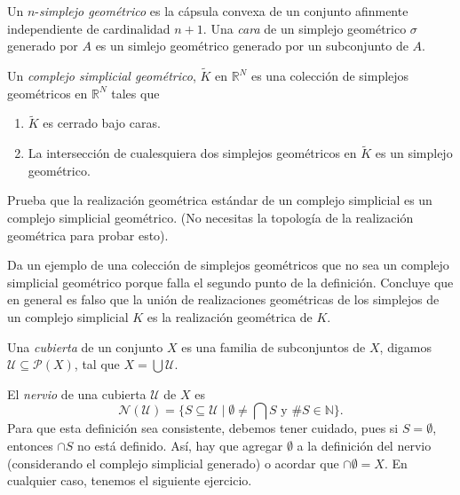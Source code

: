 \documentclass{standalone}
\begin{document}
	\begin{definition}\label{def:geometric_simplex}
		Un $n$-\emph{simplejo geométrico} es la cápsula convexa de un conjunto afinmente independiente de cardinalidad $n+1$. Una \emph{cara} de un simplejo geométrico $\sigma$ generado por $A$ es un simlejo geométrico generado por un subconjunto de $A$.
	\end{definition}
	
	\begin{definition}
		Un \emph{complejo simplicial geométrico}, $\tilde{K}$ en $\mathbb{R}^{N}$ es una colección de simplejos geométricos en $\mathbb{R}^{N}$ tales que
		\begin{enumerate}
			\item $\tilde{K}$ es cerrado bajo caras.
			\item La intersección de cualesquiera dos simplejos geométricos en $\tilde{K}$ es un simplejo geométrico.
		\end{enumerate}
	\end{definition}
	
	\begin{exercise}
		Prueba que la realización geométrica estándar de un complejo simplicial es un complejo simplicial geométrico. (No necesitas la topología de la realización geométrica para probar esto).
	\end{exercise}
	
	\begin{exercise}
		Da un ejemplo de una colección de simplejos geométricos que no sea un complejo simplicial geométrico porque falla el segundo punto de la definición. Concluye que en general es falso que la unión de realizaciones geométricas de los simplejos de un complejo simplicial $K$ es la realización geométrica de $K$.
	\end{exercise}
	
	\begin{definition}\label{def:cover}
		Una \emph{cubierta} de un conjunto $X$ es una familia de subconjuntos de $X$, digamos $\mathcal{U}\subseteq\mathcal{P}(X)$, tal que $X=\bigcup\mathcal{U}$.
	\end{definition}
	
	\begin{definition}\label{def:nerve}
		El \emph{nervio} de una cubierta $\mathcal{U}$ de $X$ es 
		\[
		\mathcal{N}(\mathcal{U})=\{S\subseteq\mathcal{U}\mid \emptyset\neq\bigcap S\text{ y }\#S\in\mathbb{N}\}.
		\]Para que esta definición sea consistente, debemos tener cuidado, pues si $S	=\emptyset$, entonces $\cap S$ no está definido. Así, hay que agregar $\emptyset$ a la definición del nervio (considerando el complejo simplicial generado) o acordar que $\cap\emptyset = X$. En cualquier caso, tenemos el siguiente ejercicio.
	\end{definition}
	
\end{document}
